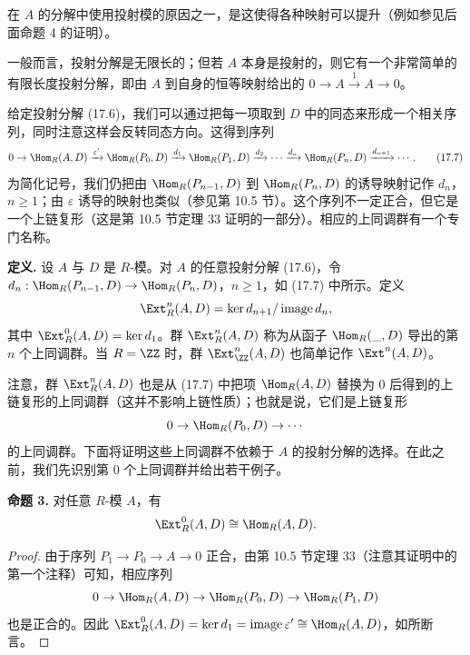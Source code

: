 在 $A$ 的分解中使用投射模的原因之一，是这使得各种映射可以提升（例如参见后面命题 4 的证明）。

一般而言，投射分解是无限长的；但若 $A$ 本身是投射的，则它有一个非常简单的有限长度投射分解，即由 $A$ 到自身的恒等映射给出的 $0\to A\xrightarrow{1}A\to0$。

给定投射分解 (17.6)，我们可以通过把每一项取到 $D$ 中的同态来形成一个相关序列，同时注意这样会反转同态方向。这得到序列
\[
  0\to\Hom_R(A,D)\xrightarrow{\varepsilon'}\Hom_R(P_0,D)\xrightarrow{d_1}\Hom_R(P_1,D)
  \xrightarrow{d_2}\cdots\xrightarrow{d_n}\Hom_R(P_n,D)\xrightarrow{d_{n+1}}\cdots .
  \tag{17.7}
\]
为简化记号，我们仍把由 $\Hom_R(P_{n-1},D)$ 到 $\Hom_R(P_n,D)$ 的诱导映射记作 $d_n$，$n\geq1$；由 $\varepsilon$ 诱导的映射也类似（参见第 10.5 节）。这个序列不一定正合，但它是一个上链复形（这是第 10.5 节定理 33 证明的一部分）。相应的上同调群有一个专门名称。

\noindent\textbf{定义.} 设 $A$ 与 $D$ 是 $R$-模。对 $A$ 的任意投射分解 (17.6)，令 $d_n:\Hom_R(P_{n-1},D)\to\Hom_R(P_n,D)$，$n\geq1$，如 (17.7) 中所示。定义
\[
  \Ext_R^n(A,D)=\ker d_{n+1}/\operatorname{image}d_n,
\]
其中 $\Ext_R^0(A,D)=\ker d_1$。群 $\Ext_R^n(A,D)$ 称为从函子 $\Hom_R(\_,D)$ 导出的第 $n$ 个上同调群。当 $R=\ZZ$ 时，群 $\Ext_{\ZZ}^n(A,D)$ 也简单记作 $\Ext^n(A,D)$。

注意，群 $\Ext_R^n(A,D)$ 也是从 (17.7) 中把项 $\Hom_R(A,D)$ 替换为 $0$ 后得到的上链复形的上同调群（这并不影响上链性质）；也就是说，它们是上链复形
\[
  0\to\Hom_R(P_0,D)\to\cdots
\]
的上同调群。下面将证明这些上同调群不依赖于 $A$ 的投射分解的选择。在此之前，我们先识别第 $0$ 个上同调群并给出若干例子。

\medskip
\noindent\textbf{命题 3.} 对任意 $R$-模 $A$，有
\[
  \Ext_R^0(A,D)\cong\Hom_R(A,D).
\]

\begin{proof}
由于序列 $P_1\to P_0\to A\to0$ 正合，由第 10.5 节定理 33（注意其证明中的第一个注释）可知，相应序列
\[
  0\to\Hom_R(A,D)\to\Hom_R(P_0,D)\to\Hom_R(P_1,D)
\]
也是正合的。因此 $\Ext_R^0(A,D)=\ker d_1=\operatorname{image}\varepsilon'\cong\Hom_R(A,D)$，如所断言。
\end{proof}

